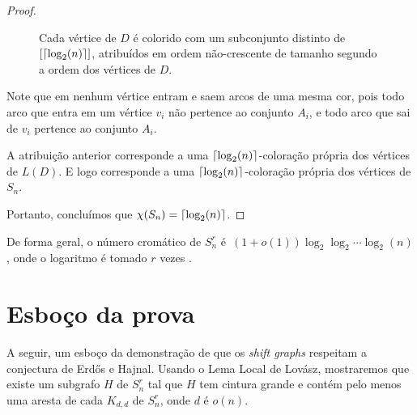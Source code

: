 \begin{proof}
\begin{figure}[H]
\centering
\caption{Cada vértice de $D$ é colorido com um subconjunto distinto de $[\lceil\log_2(n)\rceil]$, atribuídos em ordem não-crescente de tamanho segundo a ordem dos vértices de $D$.}
\label{fig:shiftchromaticsetcoloring}
\end{figure}

Note que em nenhum vértice entram e saem arcos de uma mesma cor, pois todo arco que entra em um vértice $v_i$ não pertence ao conjunto $A_i$, e todo arco que sai de $v_i$ pertence ao conjunto $A_i$.

A atribuição anterior corresponde a uma $\lceil\log_2(n)\rceil$-coloração própria dos vértices de $L(D)$. E logo corresponde a uma $\lceil\log_2(n)\rceil$-coloração própria dos vértices de $S_n$.

Portanto, concluímos que $\chi(S_n) = \lceil\log_2(n)\rceil$.
\end{proof}

De forma geral, o número cromático de $S_n^r$ é~$(1+o(1))\log_2 \log_2 \cdots \log_2 (n)$, onde o logaritmo é tomado $r$ vezes \cite{erdos1968chromatic}.


\section{Esboço da prova}

A seguir, um esboço da demonstração de que os \textit{shift graphs} respeitam a conjectura de Erd\H{o}s e Hajnal. Usando o Lema Local de Lovász, mostraremos que existe um subgrafo $H$ de $S_n^r$ tal que $H$ tem cintura grande e contém pelo menos uma aresta de cada $K_{d,d}$ de $S_n^r$, onde $d$ é $o(n)$.


